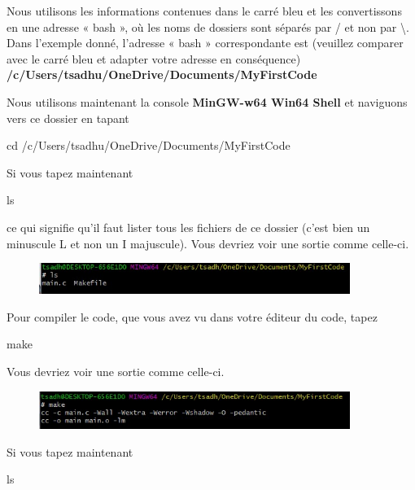 \documentclass{article}
\begin{document}
Nous utilisons les informations contenues dans le carré bleu et les convertissons en une adresse « bash », où les noms de dossiers sont séparés par / et non par \textbackslash. Dans l'exemple donné, l'adresse « bash » correspondante est (veuillez comparer avec le carré bleu et adapter votre adresse en conséquence) \textbf{/c/Users/tsadhu/OneDrive/Documents/MyFirstCode}

Nous utilisons maintenant la console {\color{MidnightBlue}\textbf{MinGW-w64 Win64 Shell}} et naviguons vers ce dossier en tapant
\begin{tcolorbox}[width=\textwidth,colframe=MidnightBlue,colback={black},title={Ceci est la console MinGW-w64 Win64 Shell},outer arc=0mm,colupper=white]    
      cd /c/Users/tsadhu/OneDrive/Documents/MyFirstCode
\end{tcolorbox}
Si vous tapez maintenant 
\begin{tcolorbox}[width=\textwidth,colframe=MidnightBlue,colback={black},title={Ceci est la console MinGW-w64 Win64 Shell},outer arc=0mm,colupper=white]    
      ls
\end{tcolorbox}
ce qui signifie qu'il faut lister tous les fichiers de ce dossier (c'est bien un minuscule L et non un I majuscule). Vous devriez voir une sortie comme celle-ci.
\begin{figure}[H]
\center
\includegraphics[width=0.9\textwidth]{Plots/FirstCode_5.jpeg}
\end{figure}
Pour compiler le code, que vous avez vu dans votre éditeur du code, tapez
\begin{tcolorbox}[width=\textwidth,colframe=MidnightBlue,colback={black},title={Ceci est la console MinGW-w64 Win64 Shell},outer arc=0mm,colupper=white]    
      make
\end{tcolorbox}
Vous devriez voir une sortie comme celle-ci.
\begin{figure}[H]
\center
\includegraphics[width=0.9\textwidth]{Plots/FirstCode_6.jpeg}
\end{figure}
Si vous tapez maintenant 
\begin{tcolorbox}[width=\textwidth,colframe=MidnightBlue,colback={black},title={Ceci est la console MinGW-w64 Win64 Shell},outer arc=0mm,colupper=white]    
      ls
\end{tcolorbox}
\end{document}
